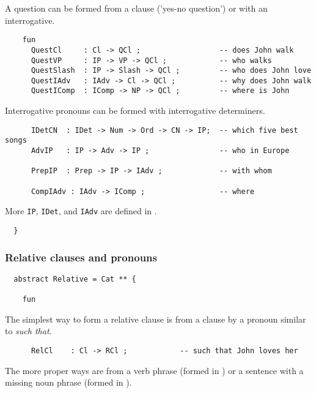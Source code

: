 \documentclass[11pt,a4paper]{article}
\newcommand{\commOut}[1]{}
\begin{document}
A question can be formed from a clause ('yes-no question') or
with an interrogative.

\begin{verbatim}
    fun
      QuestCl     : Cl -> QCl ;                  -- does John walk
      QuestVP     : IP -> VP -> QCl ;            -- who walks
      QuestSlash  : IP -> Slash -> QCl ;         -- who does John love
      QuestIAdv   : IAdv -> Cl -> QCl ;          -- why does John walk
      QuestIComp  : IComp -> NP -> QCl ;         -- where is John
\end{verbatim}

Interrogative pronouns can be formed with interrogative
determiners. 

\begin{verbatim}
      IDetCN  : IDet -> Num -> Ord -> CN -> IP;  -- which five best songs
      AdvIP   : IP -> Adv -> IP ;                -- who in Europe
  
      PrepIP  : Prep -> IP -> IAdv ;             -- with whom
  
      CompIAdv : IAdv -> IComp ;                 -- where
\end{verbatim}

More \texttt{IP}, \texttt{IDet}, and \texttt{IAdv} are defined in
.

\begin{verbatim}
  }
\end{verbatim}

\commOut{Produced by 
gfdoc - a rudimentary GF document generator.
(c) Aarne Ranta (\htmladdnormallink{aarne@cs.chalmers.se}{mailto:aarne@cs.chalmers.se}) 2002 under GNU GPL.}


\subsubsection{Relative clauses and pronouns}
\begin{verbatim}
  abstract Relative = Cat ** {
  
    fun
\end{verbatim}

The simplest way to form a relative clause is from a clause by
a pronoun similar to \textit{such that}.

\begin{verbatim}
      RelCl    : Cl -> RCl ;            -- such that John loves her
\end{verbatim}

The more proper ways are from a verb phrase (formed in ) 
or a sentence with a missing noun phrase (formed in ).
\end{document}
